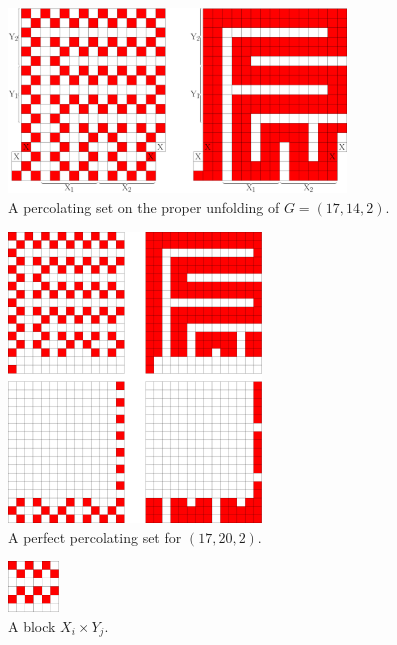 \begin{figure}[]
\centering
\includegraphics[width=0.8\textwidth]{figures/7/18x16x1_unfolded_lethal.pdf}
\caption{A percolating set on the proper unfolding of $G= (17,14,2)$.}
\label{fig:18x16x1_unfolded_lethal}
\end{figure}

\begin{figure}[]
\centering
\includegraphics[width=0.6\textwidth]{figures/7/17x14x2.pdf}
\caption{A perfect percolating set for $(17,20,2)$.}
\label{fig:11x20x2}
\end{figure} 

\begin{figure}[]
\centering
\includegraphics[width=0.12\textwidth]{figures/7/XiYj.pdf}
\caption{A block $X_i \times Y_j$.}
\label{fig:XiYj}
\end{figure} 


